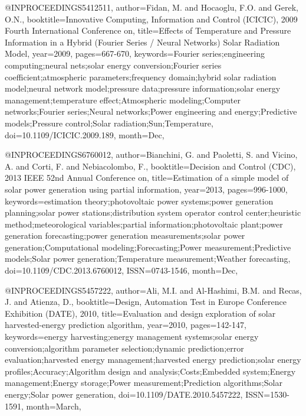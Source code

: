 @INPROCEEDINGS{5412511, 
author={Fidan, M. and Hocaoglu, F.O. and Gerek, O.N.}, 
booktitle={Innovative Computing, Information and Control (ICICIC), 2009 Fourth International Conference on}, 
title={Effects of Temperature and Pressure Information in a Hybrid (Fourier Series / Neural Networks) Solar Radiation Model}, 
year={2009}, 
pages={667-670}, 
keywords={Fourier series;engineering computing;neural nets;solar energy conversion;Fourier series coefficient;atmospheric parameters;frequency domain;hybrid solar radiation model;neural network model;pressure data;pressure information;solar energy management;temperature effect;Atmospheric modeling;Computer networks;Fourier series;Neural networks;Power engineering and energy;Predictive models;Pressure control;Solar radiation;Sun;Temperature}, 
doi={10.1109/ICICIC.2009.189}, 
month={Dec},}

@INPROCEEDINGS{6760012, 
author={Bianchini, G. and Paoletti, S. and Vicino, A. and Corti, F. and Nebiacolombo, F.}, 
booktitle={Decision and Control (CDC), 2013 IEEE 52nd Annual Conference on}, 
title={Estimation of a simple model of solar power generation using partial information}, 
year={2013}, 
pages={996-1000}, 
keywords={estimation theory;photovoltaic power systems;power generation planning;solar power stations;distribution system operator control center;heuristic method;meteorological variables;partial information;photovoltaic plant;power generation forecasting;power generation measurements;solar power generation;Computational modeling;Forecasting;Power measurement;Predictive models;Solar power generation;Temperature measurement;Weather forecasting}, 
doi={10.1109/CDC.2013.6760012}, 
ISSN={0743-1546}, 
month={Dec},}

@INPROCEEDINGS{5457222, 
author={Ali, M.I. and Al-Hashimi, B.M. and Recas, J. and Atienza, D.}, 
booktitle={Design, Automation Test in Europe Conference Exhibition (DATE), 2010}, 
title={Evaluation and design exploration of solar harvested-energy prediction algorithm}, 
year={2010}, 
pages={142-147}, 
keywords={energy harvesting;energy management systems;solar energy conversion;algorithm parameter selection;dynamic prediction;error evaluation;harvested energy management;harvested energy prediction;solar energy profiles;Accuracy;Algorithm design and analysis;Costs;Embedded system;Energy management;Energy storage;Power measurement;Prediction algorithms;Solar energy;Solar power generation}, 
doi={10.1109/DATE.2010.5457222}, 
ISSN={1530-1591}, 
month={March},}

